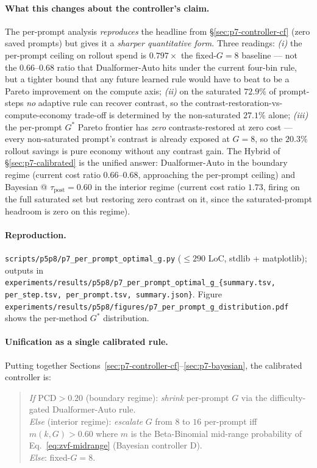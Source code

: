 \documentclass{article}
\begin{document}
\paragraph{What this changes about the controller's claim.}
The per-prompt analysis \emph{reproduces} the headline from
\S\ref{sec:p7-controller-cf} (zero saved prompts) but gives it a
\emph{sharper quantitative form}. Three readings:
\emph{(i)} the per-prompt ceiling on rollout spend is $0.797\times$ the
fixed-$G{=}8$ baseline --- not the $0.66$--$0.68$ ratio that Dualformer-Auto
hits under the current four-bin rule, but a tighter bound that any future
learned rule would have to beat to be a Pareto improvement on the
compute axis; \emph{(ii)} on the saturated $72.9\%$ of prompt-steps
\emph{no} adaptive rule can recover contrast, so the
contrast-restoration-vs-compute-economy trade-off is determined by the
non-saturated $27.1\%$ alone; \emph{(iii)} the per-prompt $G^*$ Pareto
frontier has \emph{zero} contrasts-restored at zero cost --- every
non-saturated prompt's contrast is already exposed at $G{=}8$, so the
$20.3\%$ rollout savings is pure economy without any contrast gain.
The Hybrid of \S\ref{sec:p7-calibrated} is the unified answer: Dualformer-Auto
in the boundary regime (current cost ratio $0.66$--$0.68$, approaching
the per-prompt ceiling) and Bayesian @ $\tau_\text{post} = 0.60$ in the
interior regime (current cost ratio $1.73$, firing on the full
saturated set but restoring zero contrast on it, since the
saturated-prompt headroom is zero on this regime).

\paragraph{Reproduction.}
\texttt{scripts/p5p8/p7\_per\_prompt\_optimal\_g.py} ($\leq 290$ LoC,
stdlib + matplotlib); outputs in
\texttt{experiments/results/p5p8/p7\_per\_prompt\_optimal\_g\_\{summary.tsv,
per\_step.tsv, per\_prompt.tsv, summary.json\}}.  Figure
\texttt{experiments/results/p5p8/figures/p7\_per\_prompt\_g\_distribution.pdf}
shows the per-method $G^*$ distribution.

\paragraph{Unification as a single calibrated rule.}
Putting together Sections~\ref{sec:p7-controller-cf}--\ref{sec:p7-bayesian},
the calibrated controller is:

\begin{quote}\small
\emph{If} $\mathrm{PCD} > 0.20$ (boundary regime): \emph{shrink} per-prompt
$G$ via the difficulty-gated Dualformer-Auto rule. \\
\emph{Else} (interior regime): \emph{escalate} $G$ from $8$ to $16$ per-prompt
iff $m(k, G) > 0.60$ where $m$ is the Beta-Binomial mid-range probability
of Eq.~\eqref{eq:zvf-midrange} (Bayesian controller D). \\
\emph{Else}: fixed-$G{=}8$.
\end{quote}
\end{document}
